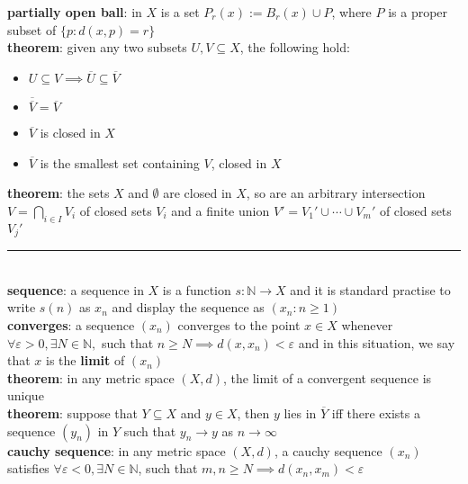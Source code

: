\documentclass[a4paper]{article}
\newcommand*\closure[1]{\overline{#1}}
\newcommand*\linesep[0]{\noindent\rule{\textwidth}{0.5pt}\\}
\begin{document}
\begin{framed}
	\noindent
	\textbf{partially open ball}: in $X$ is a set $P_r(x) := B_r(x) \cup P$, where $P$ is a proper subset of $\{p : d(x, p) = r \}$\\
	
	\noindent
	\textbf{theorem}: given any two subsets $U, V \subseteq X$, the following hold:
	\begin{multicols}{2}
		\begin{itemize}
			\item $U \subseteq V \implies \closure{U} \subseteq \closure{V}$
			\item $\closure{\closure{V}} = \closure{V}$
			\item $\closure{V}$ is closed in $X$
			\item $\closure{V}$ is the smallest set containing $V$, closed in $X$
		\end{itemize}	
	\end{multicols}
	
	\noindent
	\textbf{theorem}: the sets $X$ and $\emptyset$ are closed in $X$, so are an arbitrary intersection $V = \bigcap_{i \in I} V_i$ of closed sets $V_i$ and a finite union $V' = V_1' \cup \cdots \cup V_m'$ of closed sets $V_j'$
	
	\linesep
	\noindent
	\textbf{sequence}: a sequence in $X$ is a function $s: \mathbb{N} \rightarrow X$ and it is standard practise to write $s(n)$ as $x_n$ and display the sequence  as $(x_n : n \geq 1)$\\
	
	\noindent
	\textbf{converges}: a sequence $(x_n)$ converges to the point $x \in X$ whenever $\forall \varepsilon > 0, \exists N \in \mathbb{N},$ such that $n \geq N \implies d(x, x_n) < \varepsilon$ and in this situation, we say that $x$ is the \textbf{limit} of $(x_n)$\\
	
	\noindent
	\textbf{theorem}: in any metric space $(X, d)$, the limit of a convergent sequence is unique\\
	
	\noindent
	\textbf{theorem}: suppose that $Y \subseteq X$ and $y \in X$, then $y$ lies in $\closure{Y}$ iff there exists a sequence $(y_n)$ in $Y$ such that $y_n \rightarrow y$ as $n \rightarrow \infty$\\
	
	\noindent
	\textbf{cauchy sequence}: in any metric space $(X, d)$, a cauchy sequence $(x_n)$ satisfies $\forall \varepsilon < 0, \exists N \in \mathbb{N}$, such that $m, n \geq N \implies d(x_n, x_m) < \varepsilon$\\
	

\end{framed}
\end{document}
